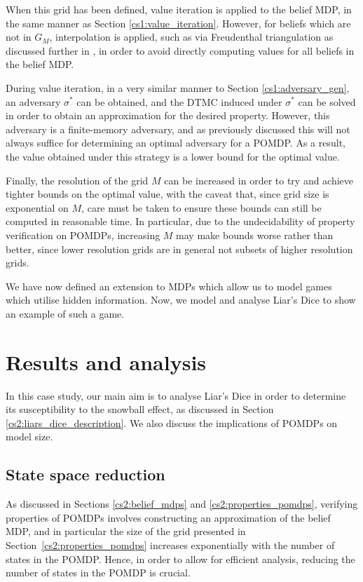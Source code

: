 When this grid has been defined, value iteration is applied to the belief MDP, in the same manner as Section \ref{cs1:value_iteration}. However, for beliefs which are not in $G_M$, interpolation is applied, such as via Freudenthal triangulation as discussed further in \cite{lovejoy_computationally_1991}, in order to avoid directly computing values for all beliefs in the belief MDP.

During value iteration, in a very similar manner to Section \ref{cs1:adversary_gen}, an adversary $\sigma^*$ can be obtained, and the DTMC induced under $\sigma^*$ can be solved in order to obtain an approximation for the desired property. However, this adversary is a finite-memory adversary, and as previously discussed this will not always suffice for determining an optimal adversary for a POMDP. As a result, the value obtained under this strategy is a lower bound for the optimal value.

Finally, the resolution of the grid $M$ can be increased in order to try and achieve tighter bounds on the optimal value, with the caveat that, since grid size is exponential on $M$, care must be taken to ensure these bounds can still be computed in reasonable time. In particular, due to the undecidability of property verification on POMDPs, increasing $M$ may make bounds worse rather than better, since lower resolution grids are in general not subsets of higher resolution grids.

We have now defined an extension to MDPs which allow us to model games which utilise hidden information. Now, we model and analyse Liar's Dice to show an example of such a game.

\section{Results and analysis}

In this case study, our main aim is to analyse Liar's Dice in order to determine its susceptibility to the snowball effect, as discussed in Section \ref{cs2:liars_dice_description}. We also discuss the implications of POMDPs on model size.

\subsection{State space reduction}
\label{cs2:state_reduction}

As discussed in Sections \ref{cs2:belief_mdps} and \ref{cs2:properties_pomdps}, verifying properties of POMDPs involves constructing an approximation of the belief MDP, and in particular the size of the grid presented in Section~\ref{cs2:properties_pomdps} increases exponentially with the number of states in the POMDP. Hence, in order to allow for efficient analysis, reducing the number of states in the POMDP is crucial.

